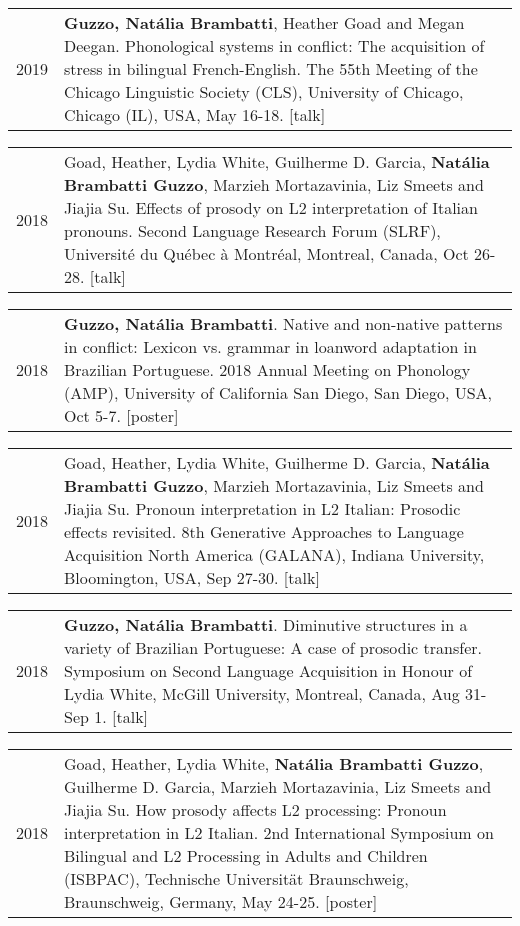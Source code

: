 \documentclass[letterpaper,10pt]{article}
\begin{document}
\begin{tabular}{p{1cm}p{16cm}}
2019 & \textbf{Guzzo, Nat\'alia Brambatti}, Heather Goad and Megan Deegan. Phonological systems in conflict: The acquisition of stress in bilingual French-English. The 55th Meeting of the Chicago Linguistic Society (CLS), University of Chicago, Chicago (IL), USA, May 16-18. [talk]
\end{tabular}


\begin{tabular}{p{1cm}p{16cm}}
2018 & Goad, Heather, Lydia White, Guilherme D. Garcia, \textbf{Nat\'alia Brambatti Guzzo}, Marzieh Mortazavinia, Liz Smeets and Jiajia Su. Effects of prosody on L2 interpretation of Italian pronouns. Second Language Research Forum (SLRF), Universit\'e du Qu\'ebec \`{a} Montr\'eal, Montreal, Canada, Oct 26-28. [talk]
\end{tabular}


\begin{tabular}{p{1cm}p{16cm}}
2018 & \textbf{Guzzo, Nat\'alia Brambatti}. Native and non-native patterns in conflict: Lexicon vs. grammar in loanword adaptation in Brazilian Portuguese. 2018 Annual Meeting on Phonology (AMP), University of California San Diego, San Diego, USA, Oct 5-7. [poster]	
\end{tabular}

\begin{tabular}{p{1cm}p{16cm}}
2018 & Goad, Heather, Lydia White, Guilherme D. Garcia, \textbf{Nat\'alia Brambatti Guzzo}, Marzieh Mortazavinia, Liz Smeets and Jiajia Su. Pronoun interpretation in L2 Italian: Prosodic effects revisited. 8th Generative Approaches to Language Acquisition North America (GALANA), Indiana University, Bloomington, USA, Sep 27-30. [talk]
\end{tabular}


\begin{tabular}{p{1cm}p{16cm}}
2018 & \textbf{Guzzo, Nat\'alia Brambatti}. Diminutive  structures  in  a variety  of  Brazilian  Portuguese:  A  case  of  prosodic  transfer. Symposium on Second Language Acquisition in Honour of Lydia White, McGill University, Montreal, Canada, Aug 31-Sep 1. [talk]
\end{tabular}


\begin{tabular}{p{1cm}p{16cm}}
2018 & Goad, Heather, Lydia White, \textbf{Nat\'alia Brambatti Guzzo}, Guilherme D. Garcia, Marzieh Mortazavinia, Liz Smeets and Jiajia Su. How prosody affects L2 processing: Pronoun interpretation in L2 Italian. 2nd International Symposium on Bilingual and L2 Processing in Adults and Children (ISBPAC), Technische Universit\"{a}t Braunschweig, Braunschweig, Germany, May 24-25. [poster]
\end{tabular}
\end{document}
